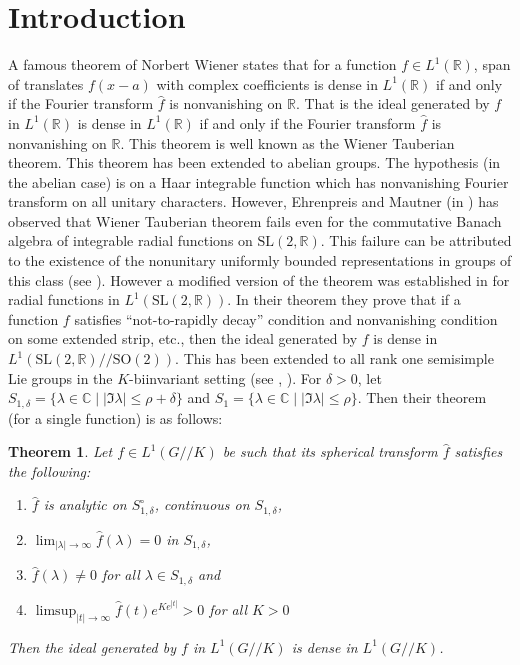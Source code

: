 \documentclass[11pt,reqno]{amsart}
\newcommand{\what}{\widehat}%
\newcommand{\R}{\mathbb R}%
\newcommand{\C}{\mathbb C}%
\newtheorem{theorem}{Theorem}[section]
\theoremstyle{definition}
\theoremstyle{definition}
\numberwithin{equation}{section}
\begin{document}
\section{Introduction}
A famous theorem of Norbert Wiener states that for a function $f\in L^1(\R)$, span of translates $f(x-a)$ with complex coefficients is dense in $L^1(\R)$ if and only if the Fourier transform $\what{f}$ is nonvanishing on $\R$. That is the ideal generated by $f$ in $L^1(\R)$ is dense in $L^1(\R)$ if and only if the Fourier transform $\what{f}$ is nonvanishing on $\R$. This theorem is well known as the Wiener Tauberian theorem.  This theorem has been extended to abelian groups. The hypothesis (in the abelian case) is on a Haar integrable function which has nonvanishing Fourier transform on all unitary characters. However, Ehrenpreis and Mautner (in \cite{EM1}) has observed that Wiener Tauberian theorem fails even for the commutative Banach algebra of integrable radial functions
on $\mathrm {SL}(2, \R)$. This failure can  be attributed to the existence of the nonunitary uniformly bounded representations in groups of this class (see \cite{EM2, K-S}). However a modified version of the theorem was established in \cite[Theorem 6]{EM1} for radial functions in $L^1(\mathrm{SL}(2, \R))$. In their theorem they prove that if a function $f$ satisfies ``not-to-rapidly decay'' condition and nonvanishing condition on some extended strip, etc., then the ideal generated by $f$ is dense in $L^1(\mathrm{SL}(2, \R)//\mathrm{SO}(2))$.   This has been  extended to all rank one semisimple Lie groups in the $K$-biinvariant setting (see \cite{Ben-0}, \cite{Sarkar-1998}). For $\delta>0$, let $S_{1, \delta}=\{\lambda\in\C\mid |\Im\lambda|\leq \rho+\delta\}$ and $S_1=\{\lambda\in\C\mid |\Im\lambda|\leq \rho\}$. Then their theorem (for a single function) is as follows:
\begin{theorem}
Let $f\in L^1(G//K)$ be such that its spherical transform $\what{f}$ satisfies the following:
\begin{enumerate}
\item $\what{f}$ is analytic on $S_{1, \delta}^\circ$, continuous on $S_{1, \delta}$,
\item $\lim_{|\lambda|\rightarrow\infty}\what{f}(\lambda)=0$ in $S_{1, \delta}$,
\item $\what{f}(\lambda)\not=0$ for all $\lambda\in S_{1, \delta}$ and 
\item $\limsup_{|t|\rightarrow\infty}\what{f}(t)e^{Ke^{|t|}}>0$ for all $K>0$

\end{enumerate}
Then the ideal generated by $f$ in $L^1(G//K)$ is dense in $L^1(G//K)$.
\end{theorem}
\end{document}
